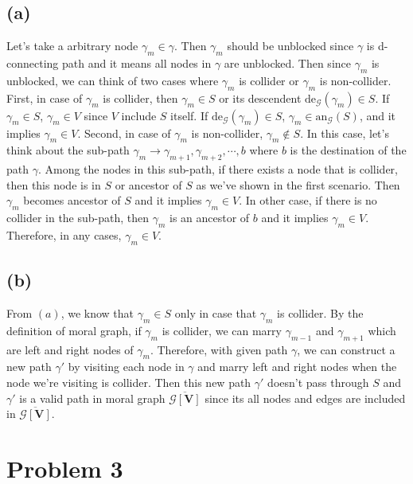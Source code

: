 \documentclass[10pt]{article}
\begin{document}
\subsection{(a)}

Let's take a arbitrary node $\gamma_m \in \gamma$. Then $\gamma_m$ should be unblocked since $\gamma$ is d-connecting path and it means all nodes in $\gamma$ are unblocked.
Then since $\gamma_m$ is unblocked, we can think of two cases where $\gamma_m$ is collider or $\gamma_m$ is non-collider. First, in case of $\gamma_m$ is collider, then $\gamma_m\in S$ or its descendent $\text{de}_{\mathcal{G}}(\gamma_m) \in S$. If $\gamma_m \in S$, $\gamma_m \in V$ since $V$ include $S$ itself. If $\text{de}_{\mathcal{G}}(\gamma_m) \in S$, $\gamma_m \in \text{an}_\mathcal{G}(S)$, and it implies $\gamma_m \in V$. 
Second, in case of $\gamma_m$ is non-collider, $\gamma_m \notin S$. In this case, let's think about the sub-path $\gamma_m \rightarrow \gamma_{m+1}, \gamma_{m+2}, \cdots, b$ where $b$ is the destination of the path $\gamma$. Among the nodes in this sub-path, if there exists a node that is collider, then this node is in $S$ or ancestor of $S$ as we've shown in the first scenario. Then $\gamma_m$ becomes ancestor of $S$ and it implies $\gamma_m \in V$. 
In other case, if there is no collider in the sub-path, 
then $\gamma_m$ is an ancestor of $b$ and it implies $\gamma_m \in V$.
Therefore, in any cases, $\gamma_m \in V$.

\subsection{(b)}

From $(a)$, we know that $\gamma_m \in S$ only in case that $\gamma_m$ is collider. By the definition of moral graph, if $\gamma_m$ is collider, we can marry 
$\gamma_{m-1}$ and $\gamma_{m+1}$ which are left and right nodes of $\gamma_m$. Therefore, with given path $\gamma$, we can construct a new path $\gamma'$ by visiting each node in $\gamma$ and marry left and right nodes when the node we're visiting is collider. Then this new path $\gamma'$ doesn't pass through $S$ and 
$\gamma'$ is a valid path in moral graph $\overline{\mathcal{G}[\mathbf{V}]}$ since its all nodes and edges are included in $\overline{\mathcal{G}[\mathbf{V}]}$.

\section{Problem 3}
\end{document}
